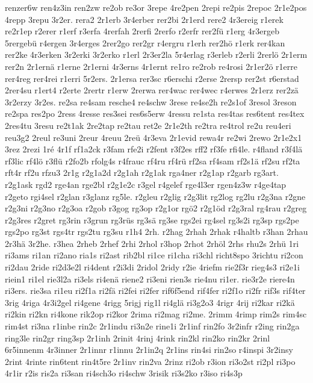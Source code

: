{renzer6w
ren4z3in
ren2zw
re2ob
re3or
3repe
4re2pen
2repi
re2pis
2repoc
2r1e2pos
4repp
3repu
3r2er.
rera2
2r1erb
3r4erber
rer2bi
2r1erd
rere2
4r3ereig
r1erek
re2r1ep
r2erer
r1erf
r3erfa
4rerfah
2rerfi
2rerfo
r2erfr
rer2fü
r1erg
4r3ergeb
5rergebü
r4ergen
3r4erges
2rer2go
rer2gr
r4ergru
r1erh
rer2hö
r1erk
rer4kan
rer2ke
4r3erken
3r2erki
3r2erko
r1erl
2r3er2la
5r4erlag
r3erleb
r2erli
2rerlö
2r1erm
rer2n
2r1ernä
r1erne
2r1erni
4r3erns
4r1ernt
re1ro
re2rob
re4rosi
2r1er2ö
r1erre
rer4reg
rer4rei
r1erri
5r2ers.
2r1ersa
rer3sc
r6erschi
r2erse
2rersp
rer2st
r6erstad
2rer4su
r1ert4
r2erte
2rertr
r1erw
2rerwa
rer4wac
rer4wec
r4erwes
2r1erz
rer2zä
3r2erzy
3r2es.
re2sa
re4sam
resche4
re4schw
3rese
re4se2h
re2s1of
3resol
3reson
re2spa
res2po
2ress
4resse
res3sei
res6s5erw
4ressu
re1sta
res4tas
res6tent
res4tex
2res4tu
3resu
re2t1ak
2re2tap
re2tau
ret2e
2r1e2th
re2tra
re4trol
re2u
reu4eri
reu3g2
2reul
re3uni
2reur
4reuu
2reü
4r3eva
2r1evid
rewa4r
re2wi
2rewo
2r1e2x1
3rez
2rezi
1ré
4r1f
rf1a2ck
r3fam
rfe2i
r2fent
r3f2es
rff2
rf3fe
rfi4le.
r4fland
r3f4lä
rf3lic
rf4lö
r3flü
r2fo2b
rfolg4s
r4frauc
rf4ru
rf4rü
rf2sa
rf4sam
rf2s1ä
rf2su
rf2ta
rft4r
rf2u
rfzu3
2r1g
r2g1a2d
r2g1ah
r2g1ak
rga4ner
r2g1ap
r2garb
rg3art.
r2g1ask
rgd2
rge4an
rge2bl
r2g1e2c
r3gel
r4gelef
rge4l3er
rgen4z3w
r4ge4tap
r2geto
rgi4sel
r2glan
r3glanz
rg5le.
r2gleu
r2glig
r2g3lit
rg2log
rg2lu
r2g3na
r2gne
r2g3ni
r2g3no
r2g3oa
r2gob
r3gog
rg3op
r2g1or
rgö2
r2g1öd
r2g3ral
rg4rau
r2greg
r2g3res
r2gret
rg3rin
r3grun
rg3rüs
rg3sä
rg3se
rgs2ei
rg4sel
rg3s2i
rg3sp
rgs2pe
rgs2po
rg3st
rgs4tr
rgs2tu
rg3su
r1h4
2rh.
r2hag
2rhah
2rhak
r4haltb
r3han
2rhau
2r3hä
3r2he.
r3hea
2rheb
2rhef
2rhi
2rhol
r3hop
2rhot
2rhöl
2rhs
rhu2s
2rhü
1ri
ri3ams
ri1an
ri2ano
ria1s
ri2ast
rib2bl
ri1ce
ri1cha
ri3chl
richt8spo
3richtu
ri2con
ri2dau
2ride
ri2d3e2l
ri4dent
r2i3di
2ridol
2ridy
r2ie
4riefm
rie2f3r
rieg4s3
ri2e1i
riein1
ri1el
rie3l2a
ri3els
ri4enä
riene2
ri3eni
rien3s
rie4nu
ri1er.
rie3r2e
riere4n
ri3ers.
rie3sa
ri1eu
ri2f1a
ri2fä
ri2fei
ri2fer
rif6f5end
rif4fer
ri2f1o
ri2fr
rif3s
rif4ter
3rig
4riga
4r3i2gel
ri4gene
4rigg
5rigj
rig1l
ri4glä
ri3g2o3
4rigr
4rij
ri2kar
ri2kä
ri2kin
ri2kn
ri4kone
rik2op
ri2kor
2rima
ri2mag
ri2me.
2rimm
4rimp
rim2s
rim4sc
rim4st
ri3na
r1inbe
rin2c
2r1indu
ri3n2e
rine1i
2r1inf
rin2fo
3r2infr
r2ing
rin2ga
ring3le
rin2gr
ring3sp
2r1inh
2rinit
4rinj
4rink
rin2kl
rin2ko
rin2kr
2rinl
6r5innenm
4r3inner
2r1innr
r1innu
2r1in2q
2r1ins
rin4si
rin2so
r4inspi
3r2insy
2rint
4rinte
rin6tent
rin4t5re
2r1inv
rin2va
2rinz
ri2ob
r3ion
ri3o2st
ri2pl
ri3po
4r1ir
r2is
ris2a
ri3san
ri4sch3o
ri4schw
3risik
ri3s2ko
r3iso
ri4s3p
}
